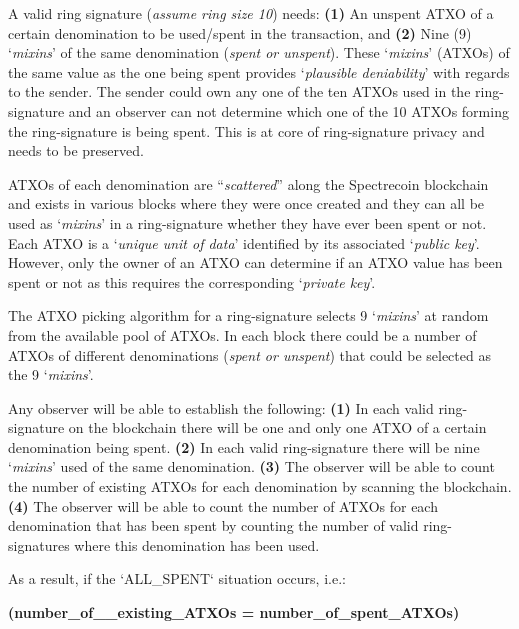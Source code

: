 A valid ring signature (\textit{assume ring size 10}) needs: \textbf{(1)} An 
unspent ATXO of a certain denomination to be used/spent in the transaction, 
and \textbf{(2)} Nine (9) ‘\textit{mixins}’ of the same denomination 
(\textit{spent or unspent}). These ‘\textit{mixins}’ (ATXOs) of the same 
value as the one being spent provides ‘\textit{plausible deniability}’ with 
regards to the sender. The sender could own any one of the ten ATXOs used 
in the ring-signature and an observer can not determine which one of the 
10 ATXOs forming the ring-signature is being spent. This is at core of 
ring-signature privacy and needs to be preserved. 



ATXOs of each denomination are “\textit{scattered}” along the Spectrecoin 
blockchain and exists in various blocks where they were once created and 
they can all be used as ‘\textit{mixins}’ in a ring-signature whether they 
have ever been spent or not. Each ATXO is a ‘\textit{unique unit of data}’ 
identified by its associated ‘\textit{public key}’. However, only the 
owner of an ATXO can determine if an ATXO value has been spent or not 
as this requires the corresponding ‘\textit{private key}’. 



The ATXO picking algorithm for a ring-signature selects 9 ‘\textit{mixins}’ 
at random from the available pool of ATXOs. In each block there could be a 
number of ATXOs of different denominations (\textit{spent or unspent}) 
that could be selected as the 9 ‘\textit{mixins}’. 



Any observer will be able to establish the following: \textbf{(1)} In each 
valid ring-signature on the blockchain there will be one and only one ATXO 
of a certain denomination being spent. \textbf{(2)} In each valid 
ring-signature there will be nine ‘\textit{mixins}’ used of the same 
denomination. \textbf{(3)} The observer will be able to count the number 
of existing ATXOs for each denomination by scanning the blockchain. 
\textbf{(4)} The observer will be able to count the number of ATXOs for 
each denomination that has been spent by counting the number of valid 
ring-signatures where this denomination has been used. 



As a result, if the ‘ALL\_SPENT‘ situation occurs, i.e.: 



\textbf{(number\_of\_\_existing\_ATXOs = number\_of\_spent\_ATXOs) }



